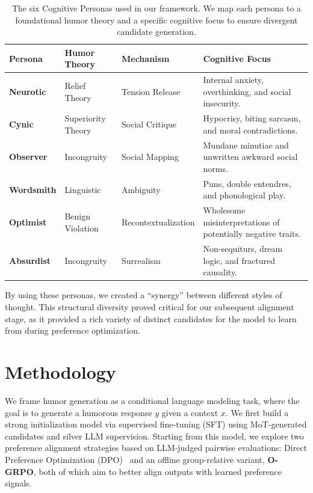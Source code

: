 \documentclass[11pt]{article}
\begin{document}
\begin{table}[t]
\centering
\small
\begin{tabularx}{\textwidth}{@{}l l l X@{}}
\toprule
\textbf{Persona} & \textbf{Humor Theory} & \textbf{Mechanism} & \textbf{Cognitive Focus} \\ 
\midrule
\textbf{Neurotic} & Relief Theory & Tension Release & Internal anxiety, overthinking, and social insecurity. \\ 
\textbf{Cynic} & Superiority Theory & Social Critique & Hypocrisy, biting sarcasm, and moral contradictions. \\ 
\textbf{Observer} & Incongruity & Social Mapping & Mundane minutiae and unwritten awkward social norms. \\ 
\textbf{Wordsmith} & Linguistic & Ambiguity & Puns, double entendres, and phonological play. \\ 
\textbf{Optimist} & Benign Violation & Recontextualization & Wholesome misinterpretations of potentially negative traits. \\ 
\textbf{Absurdist} & Incongruity & Surrealism & Non-sequiturs, dream logic, and fractured causality. \\ 
\bottomrule
\end{tabularx}
\caption{The six Cognitive Personas used in our framework. We map each persona to a foundational humor theory and a specific cognitive focus to ensure divergent candidate generation.}
\label{tab:personas}
\end{table}

By using these personas, we created a ``synergy'' between different styles of thought. This structural diversity proved critical for our subsequent alignment stage, as it provided a rich variety of distinct candidates for the model to learn from during preference optimization.

\section{Methodology}

We frame humor generation as a conditional language modeling task, where the goal is to generate a humorous response $y$ given a context $x$. We first build a strong initialization model via supervised fine-tuning (SFT) using MoT-generated candidates and silver LLM supervision. Starting from this model, we explore two preference alignment strategies based on LLM-judged pairwise evaluations: Direct Preference Optimization (DPO)~\cite{rafailov2023direct} and an offline group-relative variant, \textbf{O-GRPO}, both of which aim to better align outputs with learned preference signals.
\end{document}
